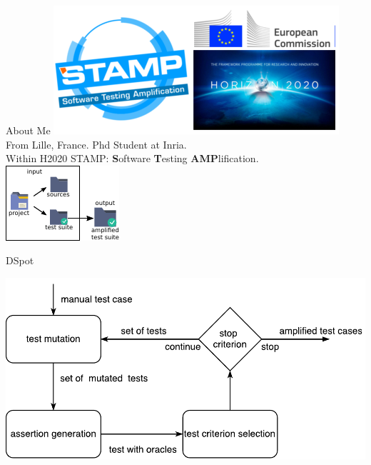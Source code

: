 \documentclass{beamer}
\begin{document}
\begin{frame}{About Me}
\includegraphics[scale=0.25]{logo_readme_md.png}\\
From Lille, France. Phd Student at Inria.\\
Within H2020 STAMP: \textbf{S}oftware \textbf{T}esting \textbf{AMP}lification.\\
\center
\includegraphics[scale=2]{dspot_1.pdf}
\end{frame}

\begin{frame}{DSpot}
\begin{center}
\includegraphics[scale=0.6]{workflow.pdf}
\end{center}
\end{frame}
\end{document}

